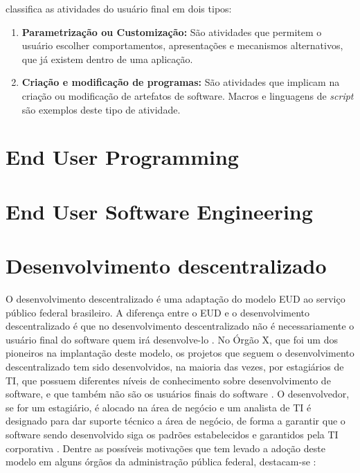  classifica as atividades do usuário final em dois tipos:

\begin{enumerate}
\item \textbf{Parametrização ou Customização:} São atividades que permitem o usuário escolher comportamentos, apresentações e mecanismos  alternativos, que já existem dentro de uma aplicação.

\item \textbf{Criação e modificação de programas:} São atividades que implicam na criação ou modificação de artefatos de software. Macros e linguagens de \textit{script} são exemplos deste tipo de atividade.
\end{enumerate}

\section{End User Programming}

\section{End User Software Engineering}

\section{Desenvolvimento descentralizado}

O desenvolvimento descentralizado é uma adaptação do modelo EUD ao serviço público federal brasileiro. A diferença entre o EUD e o desenvolvimento descentralizado é que no desenvolvimento descentralizado não é necessariamente o usuário final do software quem irá desenvolve-lo \cite{artigoTcuGovTI}. No Órgão X, que foi um dos pioneiros na implantação deste modelo, os projetos que seguem o desenvolvimento descentralizado tem sido desenvolvidos, na maioria das vezes, por estagiários de TI, que possuem diferentes níveis de conhecimento sobre desenvolvimento de software, e que também não são os usuários finais do software \cite{artigoTcuGovTI}. O desenvolvedor, se for um estagiário, é alocado na área de negócio e um analista de TI é designado para dar suporte técnico a área de negócio, de forma a garantir que o software sendo desenvolvido siga os padrões estabelecidos e garantidos pela TI corporativa \cite{artigoTcuGovTI}.
Dentre as possíveis motivações que tem levado a adoção deste modelo em alguns órgãos da administração pública federal, destacam-se \cite{slideTCU}:

